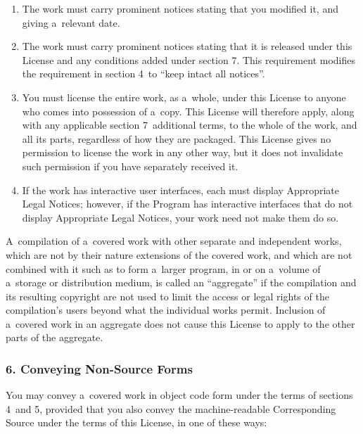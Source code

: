 \documentclass[a4paper, 11pt, twoside]{article}
\begin{document}
\begin{enumerate}[label=\Alph*)]
\item The work must carry prominent notices stating that you modified it, and giving a~relevant date.
\item The work must carry prominent notices stating that it is released under this License and any conditions added under section 7. This requirement modifies the requirement in section 4~to “keep intact all notices”.
\item You must license the entire work, as a~whole, under this License to anyone who comes into possession of a~copy. This License will therefore apply, along with any applicable section 7~additional terms, to the whole of the work, and all its parts, regardless of how they are packaged. This License gives no permission to license the work in any other way, but it does not invalidate such permission if you have separately received it.
\item If the work has interactive user interfaces, each must display Appropriate Legal Notices; however, if the Program has interactive interfaces that do not display Appropriate Legal Notices, your work need not make them do so.
\end{enumerate}

A~compilation of a~covered work with other separate and independent works, which are not by their nature extensions of the covered work, and which are not combined with it such as to form a~larger program, in or on a~volume of a~storage or distribution medium, is called an “aggregate” if the compilation and its resulting copyright are not used to limit the access or legal rights of the compilation's users beyond what the individual works permit. Inclusion of a~covered work in an aggregate does not cause this License to apply to the other parts of the aggregate.

\subsubsection{6. Conveying Non-Source Forms}

You may convey a~covered work in object code form under the terms of sections 4~and 5, provided that you also convey the machine-readable Corresponding Source under the terms of this License, in one of these ways:
\end{document}
